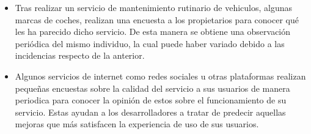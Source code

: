 \documentclass{article}
\begin{document}
    \begin{itemize}

      \item Tras realizar un servicio de mantenimiento rutinario de vehiculos, algunas marcas de coches, realizan una encuesta a los propietarios para conocer qué les ha parecido dicho servicio. De esta manera se obtiene una observación periódica del mismo individuo, la cual puede haber variado debido a las incidencias respecto de la anterior.

      \item Algunos servicios de internet como redes sociales u otras plataformas realizan pequeñas encuestas sobre la calidad del servicio a sus usuarios de manera periodica para conocer la opinión de estos sobre el funcionamiento de su servicio. Estas ayudan a los desarrolladores a tratar de predecir aquellas mejoras que más satisfacen la experiencia de uso de sus usuarios.

    \end{itemize}
	\nocite{muest2016}
  \nocite{wiki:Panel_data}
  \nocite{wiki:Panel_analysis}
  \nocite{de2007tipos}

  
  
\end{document}
